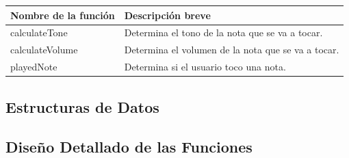 \documentclass[a4paper,10pt]{article}
\begin{document}
\begin{tabular}{| p{30mm} | p{10cm} |}
        \hline
        \textbf{Nombre de la \mbox{función}} & \textbf{Descripción breve} \\
        \hline
        calculateTone & Determina el tono de la nota que se va a tocar.\\
        calculateVolume & Determina el volumen de la nota que se va a tocar.\\
        playedNote & Determina si el usuario toco una nota.\\
        \hline
\end{tabular}
\subsection{Estructuras de Datos}
\subsection{Diseño Detallado de las Funciones}
\end{document}
